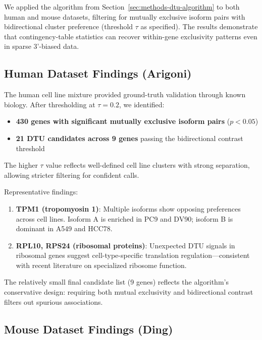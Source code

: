 We applied the algorithm from Section~\ref{sec:methods-dtu-algorithm} to both human and mouse datasets, filtering for mutually exclusive isoform pairs with bidirectional cluster preference (threshold $\tau$ as specified). The results demonstrate that contingency-table statistics can recover within-gene exclusivity patterns even in sparse 3'-biased data.

\subsection*{Human Dataset Findings (Arigoni)}\label{sec:results-human}

The human cell line mixture provided ground-truth validation through known biology. After thresholding at $\tau = 0.2$, we identified:
\begin{itemize}
    \item \textbf{430 genes with significant mutually exclusive isoform pairs} ($p < 0.05$)
    \item \textbf{21 DTU candidates across 9 genes} passing the bidirectional contrast threshold
\end{itemize}

The higher $\tau$ value reflects well-defined cell line clusters with strong separation, allowing stricter filtering for confident calls.

Representative findings:
\begin{enumerate}
    \item \textbf{TPM1 (tropomyosin 1)}: Multiple isoforms show opposing preferences across cell lines. Isoform A is enriched in PC9 and DV90; isoform B is dominant in A549 and HCC78.
    
    \item \textbf{RPL10, RPS24 (ribosomal proteins)}: Unexpected DTU signals in ribosomal genes suggest cell-type-specific translation regulation---consistent with recent literature on specialized ribosome function.
\end{enumerate}

The relatively small final candidate list (9 genes) reflects the algorithm's conservative design: requiring both mutual exclusivity and bidirectional contrast filters out spurious associations.

\subsection*{Mouse Dataset Findings (Ding)}\label{sec:results-mouse}

